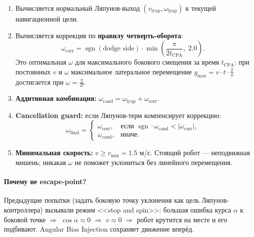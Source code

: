 \documentclass[12pt, a4paper]{article}
\newcommand{\sgn}{\operatorname{sgn}}
\theoremstyle{definition}
\theoremstyle{plain}
\begin{document}
\begin{enumerate}
  \item Вычисляется нормальный Ляпунов-выход $(v_{\text{lyap}}, \omega_{\text{lyap}})$
        к текущей навигационной цели.

  \item Вычисляется коррекция по \textbf{правилу четверть-оборота}:
        \begin{equation}\label{eq:quarter_turn}
          \omega_{\text{corr}} = \sgn(\text{dodge side}) \cdot
          \min\!\left(\frac{\pi}{2 t_{\text{CPA}}},\; 2.0\right).
        \end{equation}
        Это оптимальная $\omega$ для максимального бокового смещения за время
        $t_{\text{CPA}}$: при постоянных $v$ и $\omega$
        максимальное латеральное перемещение
        $y_{\max} = v \cdot t \cdot \frac{2}{\pi}$
        достигается при $\omega = \frac{\pi}{2t}$.

  \item \textbf{Аддитивная комбинация:}
        $\omega_{\text{cand}} = \omega_{\text{lyap}} + \omega_{\text{corr}}$.

  \item \textbf{Cancellation guard:} если Ляпунов-терм компенсирует коррекцию:
        \begin{equation}
          \omega_{\text{final}} = \begin{cases}
            \omega_{\text{corr}},  & \text{если } \sgn \cdot \omega_{\text{cand}} < |\omega_{\text{corr}}|, \\
            \omega_{\text{cand}},  & \text{иначе.}
          \end{cases}
        \end{equation}

  \item \textbf{Минимальная скорость:} $v \ge v_{\min} = 1.5$ м/с.
        Стоящий робот --- неподвижная мишень; никакая $\omega$ не поможет
        уклониться без линейного перемещения.
\end{enumerate}

\paragraph{Почему не escape-point?}  Предыдущие попытки (задать боковую точку
уклонения как цель Ляпунов-контроллера) вызывали режим <<stop and spin>>:
большая ошибка курса $\alpha$ к боковой точке $\Rightarrow$ $\cos\alpha \approx 0$
$\Rightarrow$ $v \approx 0$ $\Rightarrow$ робот крутится на месте и его подбивают.
Angular Bias Injection сохраняет движение вперёд.
\end{document}
